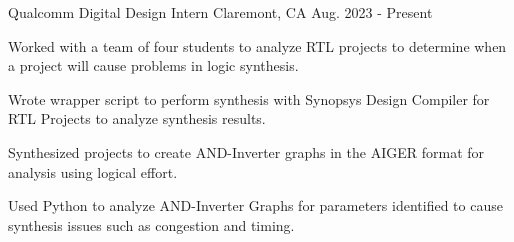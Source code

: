   \begin{cventry}
    {Qualcomm} %
    {Digital Design Intern} %
    {Claremont, CA} %
    {Aug. 2023 - Present} %
    {
    \begin{cvitems}
      \item{
      Worked with a team of four students to analyze RTL projects to determine when a project will cause problems in logic synthesis.
      }
      \item{
      Wrote wrapper script to perform synthesis with Synopsys Design Compiler for RTL Projects to analyze synthesis results.
      }
      \item{
      Synthesized projects to create AND-Inverter graphs in the AIGER format for analysis using logical effort.
      }
      \item{
      Used Python to analyze AND-Inverter Graphs for parameters identified to cause synthesis issues such as congestion and timing.
      }
    \end{cvitems}
    }
  \end{cventry}
